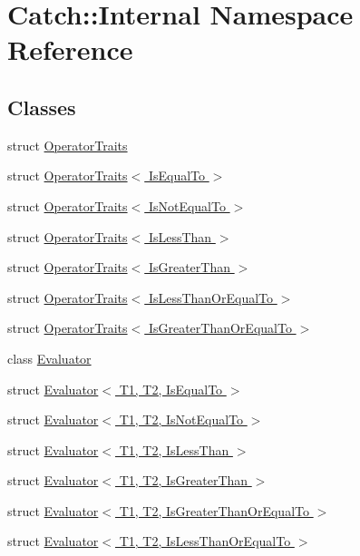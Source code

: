 \hypertarget{namespaceCatch_1_1Internal}{\section{Catch\-:\-:Internal Namespace Reference}
\label{namespaceCatch_1_1Internal}
}
\subsection*{Classes}
\begin{DoxyCompactItemize}
\item 
struct \hyperlink{structCatch_1_1Internal_1_1OperatorTraits}{Operator\-Traits}
\item 
struct \hyperlink{structCatch_1_1Internal_1_1OperatorTraits_3_01IsEqualTo_01_4}{Operator\-Traits$<$ Is\-Equal\-To $>$}
\item 
struct \hyperlink{structCatch_1_1Internal_1_1OperatorTraits_3_01IsNotEqualTo_01_4}{Operator\-Traits$<$ Is\-Not\-Equal\-To $>$}
\item 
struct \hyperlink{structCatch_1_1Internal_1_1OperatorTraits_3_01IsLessThan_01_4}{Operator\-Traits$<$ Is\-Less\-Than $>$}
\item 
struct \hyperlink{structCatch_1_1Internal_1_1OperatorTraits_3_01IsGreaterThan_01_4}{Operator\-Traits$<$ Is\-Greater\-Than $>$}
\item 
struct \hyperlink{structCatch_1_1Internal_1_1OperatorTraits_3_01IsLessThanOrEqualTo_01_4}{Operator\-Traits$<$ Is\-Less\-Than\-Or\-Equal\-To $>$}
\item 
struct \hyperlink{structCatch_1_1Internal_1_1OperatorTraits_3_01IsGreaterThanOrEqualTo_01_4}{Operator\-Traits$<$ Is\-Greater\-Than\-Or\-Equal\-To $>$}
\item 
class \hyperlink{classCatch_1_1Internal_1_1Evaluator}{Evaluator}
\item 
struct \hyperlink{structCatch_1_1Internal_1_1Evaluator_3_01T1_00_01T2_00_01IsEqualTo_01_4}{Evaluator$<$ T1, T2, Is\-Equal\-To $>$}
\item 
struct \hyperlink{structCatch_1_1Internal_1_1Evaluator_3_01T1_00_01T2_00_01IsNotEqualTo_01_4}{Evaluator$<$ T1, T2, Is\-Not\-Equal\-To $>$}
\item 
struct \hyperlink{structCatch_1_1Internal_1_1Evaluator_3_01T1_00_01T2_00_01IsLessThan_01_4}{Evaluator$<$ T1, T2, Is\-Less\-Than $>$}
\item 
struct \hyperlink{structCatch_1_1Internal_1_1Evaluator_3_01T1_00_01T2_00_01IsGreaterThan_01_4}{Evaluator$<$ T1, T2, Is\-Greater\-Than $>$}
\item 
struct \hyperlink{structCatch_1_1Internal_1_1Evaluator_3_01T1_00_01T2_00_01IsGreaterThanOrEqualTo_01_4}{Evaluator$<$ T1, T2, Is\-Greater\-Than\-Or\-Equal\-To $>$}
\item 
struct \hyperlink{structCatch_1_1Internal_1_1Evaluator_3_01T1_00_01T2_00_01IsLessThanOrEqualTo_01_4}{Evaluator$<$ T1, T2, Is\-Less\-Than\-Or\-Equal\-To $>$}
\end{DoxyCompactItemize}
